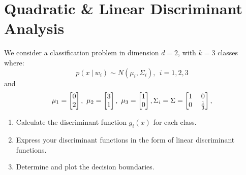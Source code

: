 \documentclass[12pt]{article}
\numberwithin{equation}{section}
\numberwithin{table}{section}
\numberwithin{figure}{section}
\begin{document}
\section{Quadratic \& Linear Discriminant Analysis}
We consider a classification problem in dimension $d=2$, with $k=3$ classes where:\\
$$
p(x\ |\ w_{i}) \sim N(\mu_{i}, \Sigma_{i}),\ \  i = 1, 2, 3
$$
and
$$
	\mu_1 = 	\renewcommand\arraystretch{1}
	\setlength\arraycolsep{6pt}
	\begin{bmatrix}
	0\\
	2\\
	\end{bmatrix},\ 
	\mu_2	 = 	\renewcommand\arraystretch{1}
	\setlength\arraycolsep{6pt}
	\begin{bmatrix}
	3\\
	1\\
	\end{bmatrix},\ 	
	\mu_3	 = 	\renewcommand\arraystretch{1}
	\setlength\arraycolsep{6pt}
	\begin{bmatrix}
	1\\
	0\\
	\end{bmatrix},
	\Sigma_{i}	 = \Sigma =	\renewcommand\arraystretch{1}
	\setlength\arraycolsep{6pt}
	\begin{bmatrix}
	1 & 0\\
	0 & \frac{1}{3}\\
	\end{bmatrix},
$$
\begin{enumerate}[label=(\alph*)]
	\item Calculate the discriminant function $g_{i}(x)$ for each class.
	
	\item Express your discriminant functions in the form of linear discriminant functions.
	
	\item Determine and plot the decision boundaries.
\end{enumerate}
\end{document}
